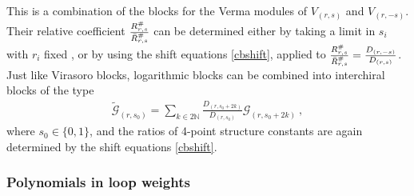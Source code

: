 \documentclass[12pt, a4paper]{article}
\begin{document}
This is a combination of the blocks for the Verma modules of $V_{(r,s)}$ and $V_{(r,-s)}$. Their relative coefficient $\frac{R^{\#}_{r,s}}{\vphantom{\tilde{|}}\bar{R}^{\#}_{r,s}}$ can be determined either by taking a limit in $s_i$ with $r_i$ fixed \cite{gnjrs21}, or by using the shift equations \eqref{cbshift}, applied to $\frac{R^{\#}_{r,s}}{\vphantom{\tilde{|}}\bar{R}^{\#}_{r,s}} = \frac{D_{(r,-s)}}{D_{(r,s)}}$. 
Just like Virasoro blocks, logarithmic blocks can be combined into interchiral blocks of the type 
\begin{align}
 \widetilde{\mathcal{G}}_{(r,s_0)} = \sum_{k\in 2\mathbb{N}} \frac{D_{(r,s_0+2k)}}{D_{(r,s_0)}} \mathcal{G}_{(r,s_0+2k)}\ , 
\end{align}
where $s_0\in \{0,1\}$, and the ratios of 4-point structure constants are again determined by the shift equations \eqref{cbshift}. 

\subsubsection{Polynomials in loop weights}\label{sec:plw}
\end{document}
